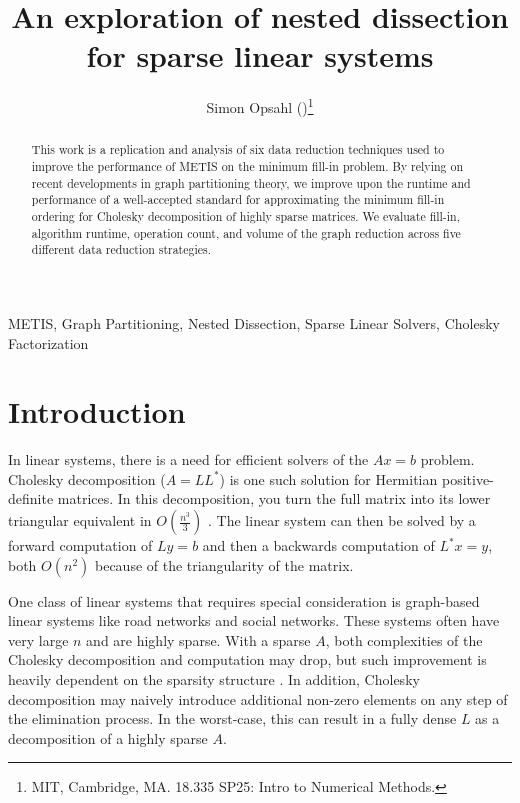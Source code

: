 \documentclass[final]{siamart250211}
\title{An exploration of nested dissection for sparse linear systems}
\author{Simon Opsahl (\email{sopsahl@mit.edu})\thanks{MIT, Cambridge, MA. 18.335 SP25: Intro to Numerical Methods.}}
\begin{document}
\maketitle


\begin{abstract}
This work is a replication and analysis of six data reduction techniques used to improve the performance of METIS on the minimum fill-in problem. By relying on recent developments in graph partitioning theory, we improve upon the runtime and performance of a well-accepted standard for approximating the minimum fill-in ordering for Cholesky decomposition of highly sparse matrices. We evaluate fill-in, algorithm runtime, operation count, and volume of the graph reduction across five different data reduction strategies. 
\end{abstract}



\begin{keywords}
METIS, Graph Partitioning, Nested Dissection,
Sparse Linear Solvers, Cholesky Factorization
\end{keywords}


\section{Introduction}
\label{sec:introduction}



 In linear systems, there is a need for efficient solvers of the $Ax=b$ problem. Cholesky decomposition ($A = LL^\ast$) is one such solution for Hermitian positive-definite matrices. In this decomposition, you turn the full matrix into its lower triangular equivalent in $O(\frac{n^3}{3})$ \cite{TiWa67}. The linear system can then be solved by a forward computation of $Ly = b$ and then a backwards computation of $L^\ast x = y$, both $O(n^2)$ because of the triangularity of the matrix.
 
 One class of linear systems that requires special consideration is graph-based linear systems like road networks and social networks. These systems often have very large $n$ and are highly sparse. With a sparse $A$, both complexities of the Cholesky decomposition and computation may drop, but such improvement is heavily dependent on the sparsity structure \cite{TiWa67}. In addition, Cholesky decomposition may naively introduce additional non-zero elements on any step of the elimination process. In the worst-case, this can result in a fully dense $L$ as a decomposition of a highly sparse $A$. 
 
\end{document}
